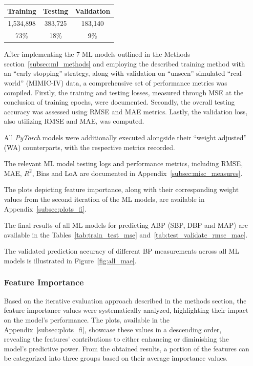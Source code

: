 \begin{center}
    \begin{tabular}{|c|c|c|}
        \hline
        Training  & Testing & Validation \\
        \hline
        1,534,898 & 383,725 & 183,140    \\
        \hline
        73\%      & 18\%    & 9\%        \\
        \hline
    \end{tabular}
\end{center}

After implementing the 7 ML models outlined in the Methods section~\ref{subsec:ml_methods} and employing the described training method with an \enquote{early stopping} strategy,
along with validation on \enquote{unseen} simulated \enquote{real-world} (MIMIC-IV) data, a comprehensive set of performance metrics was compiled.
Firstly, the training and testing losses, measured through MSE at the conclusion of training epochs, were documented.
Secondly, the overall testing accuracy was assessed using RMSE and MAE metrics.
Lastly, the validation loss, also utilizing RMSE and MAE, was computed.

All \textit{PyTorch} models were additionally executed alongside their \enquote{weight adjusted} (WA) counterparts, with the respective metrics recorded.

The relevant ML model testing logs and performance metrics, including RMSE, MAE, \textit{$R^2$}, Bias and LoA are documented in Appendix~\ref{subsec:misc_measures}.

The plots depicting feature importance, along with their corresponding weight values from the second iteration of the ML models, are available in Appendix~\ref{subsec:plots_fi}.

The final results of all ML models for predicting ABP (SBP, DBP and MAP) are available in the Tables~\ref{tab:train_test_mse} and~\ref{tab:test_validate_rmse_mae}.

The validated prediction accuracy of different BP measurements across all ML models is illustrated in Figure~\ref{fig:all_mae}.

\subsubsection{Feature Importance}

Based on the iterative evaluation approach described in the methods section, the feature importance values were systematically analyzed, highlighting their impact on the model's performance.
The plots, available in the Appendix~\ref{subsec:plots_fi}, showcase these values in a descending order, revealing the features' contributions to either enhancing or diminishing the model's predictive power.
From the obtained results, a portion of the features can be categorized into three groups based on their average importance values.

